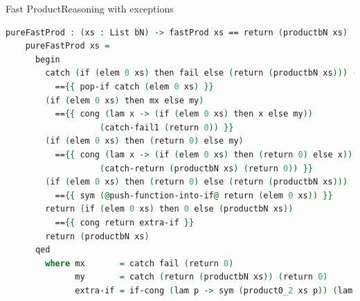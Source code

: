 \documentclass{beamer}
\begin{document}
\begin{frame}[fragile]{Fast Product}{Reasoning with exceptions}
  \begin{lstlisting}[language=Agda, mathescape]
    pureFastProd : (xs : List bN) -> fastProd xs == return (productbN xs)
    pureFastProd xs =
      begin
        catch (if (elem 0 xs) then fail else (return (productbN xs))) (return 0)
          =={{ pop-if catch (elem 0 xs) }}
        (if (elem 0 xs) then mx else my)
          =={{ cong (lam x -> (if (elem 0 xs) then x else my))
                   (catch-fail1 (return 0)) }}
        (if (elem 0 xs) then (return 0) else my)
          =={{ cong (lam x -> (if (elem 0 xs) then (return 0) else x))
                   (catch-return (productbN xs) (return 0)) }}
        (if (elem 0 xs) then (return 0) else (return (productbN xs)))
          =={{ sym (@push-function-into-if@ return (elem 0 xs)) }}
        return (if (elem 0 xs) then 0 else (productbN xs))
          =={{ cong return extra-if }}
        return (productbN xs)
      qed
        where mx       = catch fail (return 0)
              my       = catch (return (productbN xs)) (return 0)
              extra-if = if-cong (lam p -> sym (product0_2 xs p)) (lam _ -> refl)
  \end{lstlisting}
\end{frame}
\end{document}
